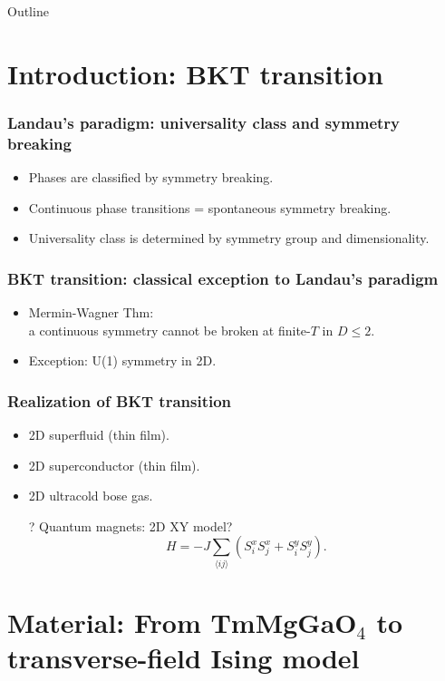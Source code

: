 \documentclass[xcolor=table, aspectratio=1610,ignorenonframetext]{beamer}
\begin{document}
\begin{frame}{Outline}
		\tableofcontents
\end{frame}

\section{Introduction: BKT transition}

\begin{frame}
	\frametitle{Landau's paradigm: universality class and symmetry breaking}
	\begin{itemize}
		\item Phases are classified by symmetry breaking.
		\item Continuous phase transitions = spontaneous symmetry breaking.
		\item Universality class is determined by symmetry group and dimensionality.
	\end{itemize}
\end{frame}

\begin{frame}
	\frametitle{BKT transition: classical exception to Landau's paradigm}
	\begin{itemize}
		\item Mermin-Wagner Thm:\\a continuous symmetry cannot be broken at finite-$T$ in $D\leq2$.
		\item Exception: U(1) symmetry in 2D.
	\end{itemize}
\end{frame}

\begin{frame}
	\frametitle{Realization of BKT transition}
	\begin{itemize}
		\item 2D superfluid (thin film).
		\item 2D superconductor (thin film).
		\item 2D ultracold bose gas.
		\item[?] Quantum magnets: 2D XY model?
		\[H=-J\sum_{\langle ij\rangle}\left(S_i^xS_j^x + S_i^yS_j^y\right).\]
	\end{itemize}
\end{frame}

\section{Material: From TmMgGaO${}_4$ to transverse-field Ising model}
\end{document}
